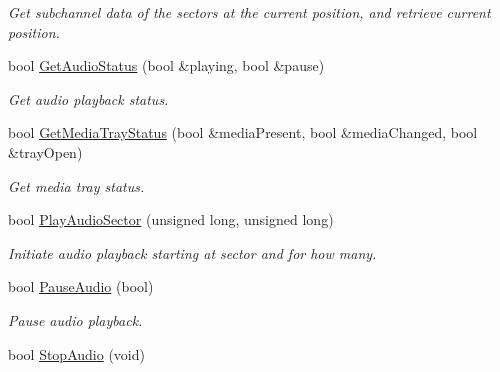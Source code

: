 \begin{DoxyCompactItemize}
\begin{DoxyCompactList}\small\item\em Get subchannel data of the sectors at the current position, and retrieve current position. \end{DoxyCompactList}\item 
\hypertarget{classCDROM__Interface__Fake_a600834e869be578a320c719b26ab2e93}{bool \hyperlink{classCDROM__Interface__Fake_a600834e869be578a320c719b26ab2e93}{Get\-Audio\-Status} (bool \&playing, bool \&pause)}\label{classCDROM__Interface__Fake_a600834e869be578a320c719b26ab2e93}

\begin{DoxyCompactList}\small\item\em Get audio playback status. \end{DoxyCompactList}\item 
\hypertarget{classCDROM__Interface__Fake_a97677cbe31ed7fb3f777fcaa7307bcba}{bool \hyperlink{classCDROM__Interface__Fake_a97677cbe31ed7fb3f777fcaa7307bcba}{Get\-Media\-Tray\-Status} (bool \&media\-Present, bool \&media\-Changed, bool \&tray\-Open)}\label{classCDROM__Interface__Fake_a97677cbe31ed7fb3f777fcaa7307bcba}

\begin{DoxyCompactList}\small\item\em Get media tray status. \end{DoxyCompactList}\item 
\hypertarget{classCDROM__Interface__Fake_a6b8236c5041698ebcf1c136aeebde117}{bool \hyperlink{classCDROM__Interface__Fake_a6b8236c5041698ebcf1c136aeebde117}{Play\-Audio\-Sector} (unsigned long, unsigned long)}\label{classCDROM__Interface__Fake_a6b8236c5041698ebcf1c136aeebde117}

\begin{DoxyCompactList}\small\item\em Initiate audio playback starting at sector and for how many. \end{DoxyCompactList}\item 
\hypertarget{classCDROM__Interface__Fake_a9fa2dfc2b09b1a91ce607d54636a9ce5}{bool \hyperlink{classCDROM__Interface__Fake_a9fa2dfc2b09b1a91ce607d54636a9ce5}{Pause\-Audio} (bool)}\label{classCDROM__Interface__Fake_a9fa2dfc2b09b1a91ce607d54636a9ce5}

\begin{DoxyCompactList}\small\item\em Pause audio playback. \end{DoxyCompactList}\item 
\hypertarget{classCDROM__Interface__Fake_a2ef5025cac6123dc9abb7ac35797c7b1}{bool \hyperlink{classCDROM__Interface__Fake_a2ef5025cac6123dc9abb7ac35797c7b1}{Stop\-Audio} (void)}\label{classCDROM__Interface__Fake_a2ef5025cac6123dc9abb7ac35797c7b1}


\end{DoxyCompactItemize}
